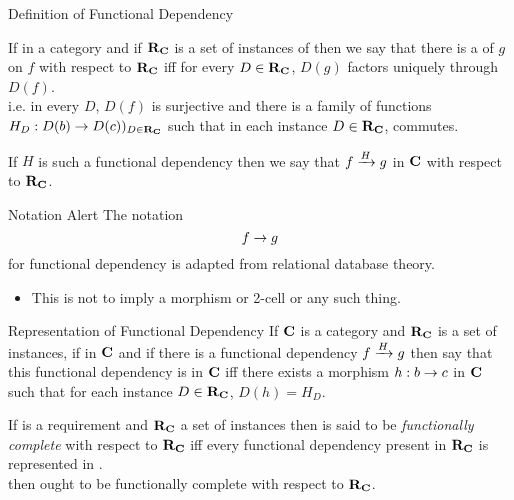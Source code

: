 \begin{frame}{Definition of Functional Dependency}
\begin{definition}
If \scalebox{0.9}{\fgsourcediagram} in a category \catcw  and if $\reqtc$ is a set of instances of \catcw
then we say that there is a   of $g$ on $f$ with respect to $\reqtc$ iff
for every $D \in \reqtc$, $D(g)$ factors uniquely through $D(f)$. \\
\pause \medskip
i.e.  in every $D$, $D(f)$ is surjective and there is a family of  functions $H_D:D(b) \morph D(c))_{D \in \reqtc}$
such that in each instance $D \in \reqtc$,
 commutes.
\end{definition}

\pause If $H$ is such a functional dependency then we say that $\fundep{H}{f}{g}$ in $\catc$ with respect to $\reqtc$.
\end{frame}

\begin{frame}{Notation Alert}
The notation 
$$
f \morph g
$$
for functional dependency is adapted from relational database theory. 

\begin{itemize}
\item This is not to imply a morphism or 2-cell or any such thing.
\end{itemize}
\end{frame}

\begin{frame}
\begin{definition}{Representation of Functional Dependency}
If $\catc$ is a category and $\reqtc$ is a set of instances, 
if \fgsourcediagram in $\catc$ 
and if there is a functional dependency $\fundep{H}{f}{g}$ then say that 
this functional dependency  is  in $\catc$ 
iff there exists a morphism $h:b \morph c$ in $\catc$ such that for each instance $D \in \reqtc$, $D(h)=H_D$.
\end{definition}
\medskip
If \catcw is a requirement and $\reqtc$ a set of instances then \catcw is said to be 
\textit{functionally complete} with respect to $\reqtc$ iff every functional dependency
present in $\reqtc$ is represented in \catc.\\
\medskip
{}\IfSforCwithRCwords then \catcw ought to be functionally complete with respect to $\reqtc$.
\end{frame}

